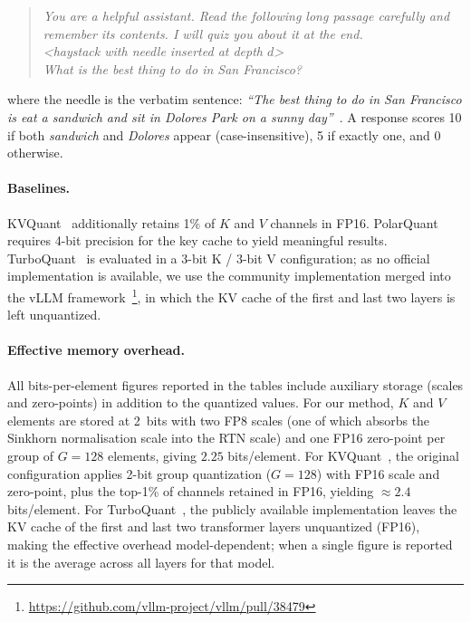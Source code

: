 \documentclass{llmxive}
\begin{document}
\begin{quote}\small
\textit{You are a helpful assistant. Read the following long passage carefully and remember its contents. I will quiz you about it at the end.}\\[2pt]
\textit{<haystack with needle inserted at depth $d$>}\\[2pt]
\textit{What is the best thing to do in San Francisco?}
\end{quote}

\noindent where the needle is the verbatim sentence: \emph{``The best thing to do in San Francisco is eat a sandwich and sit in Dolores Park on a sunny day''}~\citep{kamradt2023needle}. A response scores 10 if both \emph{sandwich} and \emph{Dolores} appear (case-insensitive), 5 if exactly one, and 0 otherwise.

\paragraph{Baselines.}
KVQuant~\citep{hooper2024kvquant} additionally retains 1\% of $K$ and $V$ channels in FP16. PolarQuant~\citep{wu2026polarquant} requires 4-bit precision for the key cache to yield meaningful results. TurboQuant~\citep{zandieh2026turboquant} is evaluated in a 3-bit K / 3-bit V configuration; as no official implementation is available, we use the community implementation merged into the vLLM framework~\citep{kwon2023efficientvLLM}\footnote{\url{https://github.com/vllm-project/vllm/pull/38479}}, in which the KV cache of the first and last two layers is left unquantized.

\paragraph{Effective memory overhead.}
All bits-per-element figures reported in the tables include auxiliary storage
(scales and zero-points) in addition to the quantized values. For our method, $K$ and $V$ elements are stored at 2~bits with two FP8 scales (one of which absorbs the Sinkhorn normalisation scale into the RTN scale) and
one FP16 zero-point per group of $G{=}128$ elements, giving $2.25$ bits/element.
For KVQuant~\citep{hooper2024kvquant}, the original configuration applies 2-bit
group quantization ($G{=}128$) with FP16 scale and zero-point, plus the top-1\%
of channels retained in FP16, yielding $\approx\!2.4$ bits/element.
For TurboQuant~\citep{zandieh2026turboquant}, the publicly available implementation leaves the KV cache of the first and last two transformer layers unquantized (FP16), making the effective overhead model-dependent; when a single figure is reported it is the average across all layers for that model.
\end{document}
